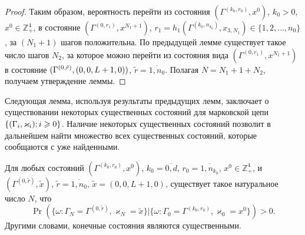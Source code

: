\documentclass[a4paper,12pt,russian]{extarticle}
\newcommand{\Mark}{\{(\Gamma_i, \varkappa_i); \hm{} i \geqslant 0\}}
\begin{document}
\begin{proof}
Таким образом, вероятность перейти из состояния $(\Gamma^{(k_0,r_0)},x^0)$, $k_0>0$, $x^0 \in \mathbb{Z}_+^4$, в состояние $(\Gamma^{(0,r_1)},x^{N_1+1})$, $r_1=h_1(\Gamma^{(k_0,n_{k_0})},x_{3,N_1}) \in \{1, 2, \ldots, n_0\}$,
за $(N_1+1)$ шагов положительна. По предыдущей лемме существует такое число шагов $N_2$, за которое можно перейти из состояния вида $(\Gamma^{(0,r_1)},x^{N_1+1})$ в состояние $(\Gamma^{(0,\tilde{r})},(0,0,L\hm+1,0))$, $\tilde{r}=\overline{1,n_0}$. Полагая $N=N_1+1+N_2$, получаем утверждение леммы.
\end{proof}

Следующая лемма, используя результаты предыдущих лемм, заключает о существовании некоторых существенных состояний для марковской цепи $\Mark$. Наличие некоторых существенных состояний позволит в дальнейшем найти множество всех существенных состояний, которые сообщаются с уже найденными.
\begin{lemma}\label{all:in:one}
Для любых состояний $(\Gamma^{(k_0,r_0)},x^0)$, $k_0=\overline{0,d}$, $r_0=\overline{1,n_{k_0}}$, $x^0 \in \mathbb{Z}_+^4$, и $(\Gamma^{(0,\tilde{r})},\tilde{x})$, $\tilde{r} = \overline{1,n_0}$, $\tilde{x}=(0,0,L+1,0)$, существует такое натуральное число $N$, что 
\begin{equation*}
\Pr(\{\omega\colon \Gamma_{N}=\Gamma^{(0,\tilde{r} )}, \varkappa_{N}=\tilde{x}\}|
\{\omega\colon \Gamma_{0}=\Gamma^{(k_0,r_0)}, \varkappa_{0}=x^0\})>0.
\end{equation*}
Другими словами, конечные состояния являются существенными.
\label{first:lemma}
\end{lemma}
\end{document}
